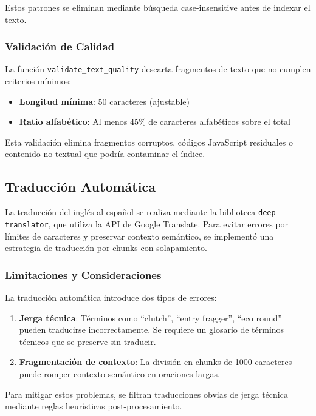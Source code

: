 Estos patrones se eliminan mediante búsqueda case-insensitive antes de indexar el texto.

\subsubsection{Validación de Calidad}

La función \texttt{validate\_text\_quality} descarta fragmentos de texto que no cumplen criterios mínimos:

\begin{itemize}
    \item \textbf{Longitud mínima}: 50 caracteres (ajustable)
    \item \textbf{Ratio alfabético}: Al menos 45\% de caracteres alfabéticos sobre el total
\end{itemize}

Esta validación elimina fragmentos corruptos, códigos JavaScript residuales o contenido no textual que podría contaminar el índice.

\subsection{Traducción Automática}

La traducción del inglés al español se realiza mediante la biblioteca \texttt{deep-translator}, que utiliza la API de Google Translate. Para evitar errores por límites de caracteres y preservar contexto semántico, se implementó una estrategia de traducción por chunks con solapamiento.

\subsubsection{Limitaciones y Consideraciones}

La traducción automática introduce dos tipos de errores:

\begin{enumerate}
    \item \textbf{Jerga técnica}: Términos como ``clutch'', ``entry fragger'', ``eco round'' pueden traducirse incorrectamente. Se requiere un glosario de términos técnicos que se preserve sin traducir.
    \item \textbf{Fragmentación de contexto}: La división en chunks de 1000 caracteres puede romper contexto semántico en oraciones largas.
\end{enumerate}

Para mitigar estos problemas, se filtran traducciones obvias de jerga técnica mediante reglas heurísticas post-procesamiento.

